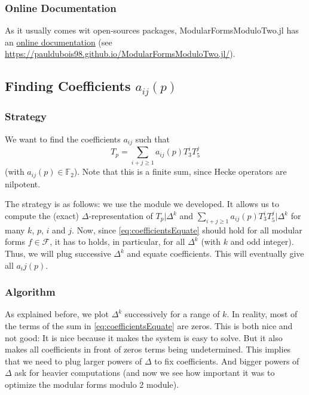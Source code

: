 \subsubsection{Online Documentation}
As it usually comes wit open-sources packages, ModularFormsModuloTwo.jl has an \href{https://pauldubois98.github.io/ModularFormsModuloTwo.jl/}{online documentation} (see \url{https://pauldubois98.github.io/ModularFormsModuloTwo.jl/}).




\subsection{Finding Coefficients $a_{ij}(p)$}
\label{finding_a_ij(p)}
\subsubsection{Strategy}
We want to find the coefficients $a_{ij}$ such that 
\begin{equation}
\label{eq:coefficientsEquate}
	T_p = \sum_{i+j \geq 1} a_{ij}(p)T_3^iT_5^j \tag{$*$}
\end{equation}
(with $a_{ij}(p) \in \mathbb{F}_2$).
Note that this is a finite sum, since Hecke operators are nilpotent.

The strategy is as follows: we use the module we developed.
It allows us to compute the (exact) $\Delta$-representation of $T_p|\Delta^k$ and $\sum_{i+j \geq 1} a_{ij}(p) T_3^iT_5^j|\Delta^k$ for many $k$, $p$, $i$ and $j$.
Now, since \eqref{eq:coefficientsEquate} should hold for all modular forms $f \in \mathcal{F}$, it has to holds, in particular, for all $\Delta^k$ (with $k$ and odd integer).
Thus, we will plug successive $\Delta^k$ and equate coefficients.
This will eventually give all $a_ij(p)$.

\subsubsection{Algorithm}
As explained before, we plot $\Delta^k$ successively for a range of $k$.
In reality, most of the terms of the sum in \ref{eq:coefficientsEquate} are zeros.
This is both nice and not good:
It is nice because it makes the system is easy to solve.
But it also makes all coefficients in front of zeros terms being undetermined.
This implies that we need to plug larger powers of $\Delta$ to fix coefficients.
And bigger powers of $\Delta$ ask for heavier computations (and now we see how important it was to optimize the modular forms modulo 2 module).

